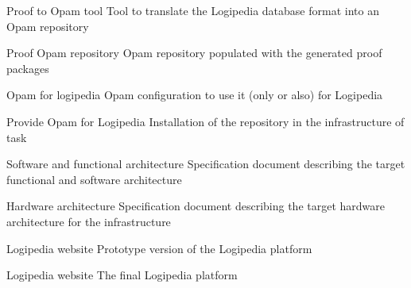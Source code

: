 \begin{workpackage}[id=access,wphases=0-48,type=MGT,
  short=Access,%
  title={Access to the infrastructure},
  lead=Irt,IrtRM=23,OcaRM=6,EduRM=12,InrRM=18]
\begin{tasklist}
\end{tasklist}

\begin{wpdelivs}

  
  \begin{wpdeliv}[due=18,miles=???,id=opamtool,dissem=PU,nature=OTHER,lead=Oca]{Proof to Opam tool}
    Tool to translate the Logipedia database format into an Opam repository
  \end{wpdeliv}

  \begin{wpdeliv}[due=19,miles=???,id=opamrepo,dissem=PU,nature=OTHER,lead=Oca]{Proof Opam repository}
    Opam repository populated with the generated proof packages
  \end{wpdeliv}

  \begin{wpdeliv}[due=20,miles=???,id=opamconfig,dissem=PU,nature=OTHER,lead=Oca]{Opam for logipedia}
    Opam configuration to use it (only or also) for Logipedia
  \end{wpdeliv}

  \begin{wpdeliv}[due=21,miles=???,id=opaminstall,dissem=PU,nature=OTHER,lead=Oca]{Provide Opam for Logipedia}
    Installation of the repository in the infrastructure of task 
  \end{wpdeliv}

  
  \begin{wpdeliv}[due=5,miles=???,id=archi-spec,dissem=PU,nature=R,lead=Irt]{Software and functional architecture}
    Specification document describing the target functional and software architecture
  \end{wpdeliv}

  \begin{wpdeliv}[due=7,miles=???,id=infra-spec,dissem=PU,nature=R,lead=Irt]{Hardware architecture}
    Specification document describing the target hardware architecture for the infrastructure
  \end{wpdeliv}

  \begin{wpdeliv}[due=14,miles=???,id=website,dissem=PU,nature=DEM,lead=Irt]{Logipedia website}
    Prototype version of the Logipedia platform
  \end{wpdeliv}

  \begin{wpdeliv}[due=27,miles=???,id=website,dissem=PU,nature=DEM,lead=Irt]{Logipedia website}
    The final Logipedia platform
  \end{wpdeliv}


\end{wpdelivs}
\end{workpackage}
